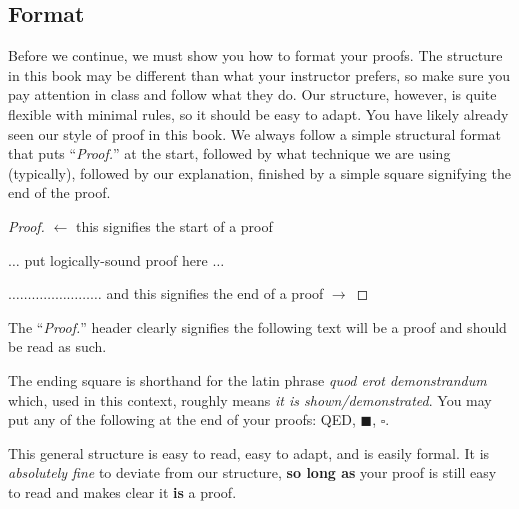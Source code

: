 \documentclass[main.tex]{subfiles}
\begin{document}
\subsection{Format}

Before we continue, we must show you how to format your proofs. The structure in this book may be different than what your instructor prefers, so make sure you pay attention in class and follow what they do. Our structure, however, is quite flexible with minimal rules, so it should be easy to adapt. You have likely already seen our style of proof in this book. We always follow a simple structural format that puts ``\textit{Proof.}'' at the start, followed by what technique we are using (typically), followed by our explanation, finished by a simple square signifying the end of the proof.

\begin{proof}
	\(\leftarrow\) this signifies the start of a proof
	
	\vspace{2em}
	
	\begin{center}
		\(\dots\) put logically-sound proof here \(\dots\)
	\end{center}
	
	\vspace{2em}
	
	\hfill \(\dots \dots \dots \dots \dots \dots \dots \dots \) and this signifies the end of a proof \(\rightarrow\)
\end{proof}

The ``\textit{Proof.}'' header clearly signifies the following text will be a proof and should be read as such.

The ending square is shorthand for the latin phrase \textit{quod erot demonstrandum} which, used in this context, roughly means \textit{it is shown/demonstrated}. You may put any of the following at the end of your proofs: QED, \(\blacksquare\), \(\square\).

This general structure is easy to read, easy to adapt, and is easily formal. It is \textit{absolutely fine} to deviate from our structure, \textbf{so long as} your proof is still easy to read and makes clear it \textbf{is} a proof.
\end{document}
